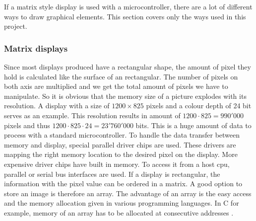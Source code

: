 
If a matrix style display is used with a microcontroller, there are a lot of different ways to draw graphical elements. This section covers only the ways used in this project. 

\subsubsection{Matrix displays}
Since most displays produced have a rectangular shape, the amount of pixel they hold is calculated like the surface of an rectangular. The number of pixels on both axis are multiplied and we get the total amount of pixels we have to manipulate. So it is obvious that the memory size of a picture explodes with its resolution. A display with a size of $1200 \times 825$ pixels and a colour depth of 24 bit serves as an example. This resolution results in amount of $1200\cdot825=990'000$ pixels and thus $1200\cdot825\cdot24=23'760'000$ bits. This is a huge amount of data to process with a standard microcontroller.
To handle the data transfer between memory and display, special parallel driver chips are used. These drivers are mapping the right memory location to the desired pixel on the display. More expensive driver chips have built in memory. To access it from a host \acs{cpu}, parallel or serial bus interfaces are used. If a display is rectangular, the information with the pixel value can be ordered in a matrix.
A good option to store an image is therefore an array.
The advantage of an array is the easy access and the memory allocation given in various programming languages.
In C for example, memory of an array has to be allocated at consecutive addresses \cite{ISO/IEC9899}.
 





